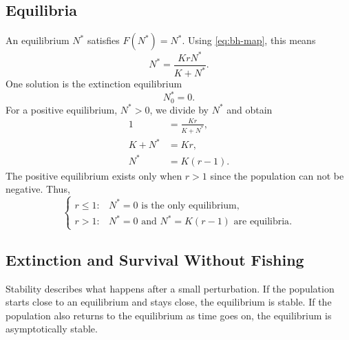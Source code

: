 \documentclass{article}
\numberwithin{equation}{section}
\begin{document}
\subsection{Equilibria}
An equilibrium $N^*$ satisfies $F(N^*)=N^*$. Using \eqref{eq:bh-map},
this means
\begin{equation*}
    N^* = \frac{K r N^*}{K + N^*}.
\end{equation*}
One solution is the extinction equilibrium
\begin{equation*}
    N^*_0=0.
\end{equation*}
For a positive equilibrium, $N^*>0$, we divide by $N^*$ and obtain
\begin{align*}
    1 &= \frac{K r}{K+N^*},\\
    K+N^* &= Kr,\\
    N^* &= K(r-1).
\end{align*}
The positive equilibrium exists only when $r>1$ since the population can
not be negative. Thus,
\begin{equation*}
    \begin{cases}
        r\leq 1: & N^*=0 \text{ is the only equilibrium},\\
        r>1: & N^*=0 \text{ and } N^*=K(r-1) \text{ are equilibria}.
    \end{cases}
\end{equation*}
\subsection{Extinction and Survival Without Fishing}
Stability describes what happens after a small perturbation. If the
population starts close to an equilibrium and stays close, the
equilibrium is stable. If the population also returns to the equilibrium
as time goes on, the equilibrium is asymptotically stable.
\end{document}
